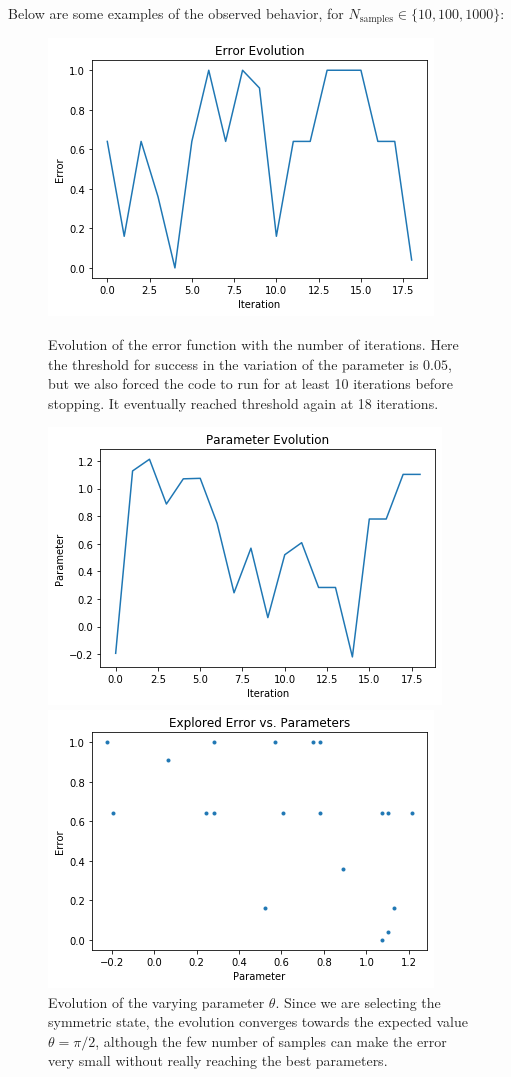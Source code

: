 \documentclass[11pt]{article}
\begin{document}
Below are some examples of the observed behavior, for $N_{\text{samples}} \in \{10,100,1000\}$: 


\begin{figure}[h!]
\centering
\includegraphics[scale=0.5]{error10}
\caption{Evolution of the error function with the number of iterations. Here the threshold for success in the variation of the parameter is $0.05$, but we also forced the code to run for at least 10 iterations before stopping. It eventually reached threshold again at 18 iterations.}
\includegraphics[scale=0.5]{parameter10}
\caption{Evolution of the varying parameter $\theta$. Since we are selecting the symmetric state, the evolution converges towards the expected value $\theta = \pi/2$, although the few number of samples can make the error very small without really reaching the best parameters.}
\includegraphics[scale=0.5]{explored10}

\end{figure}
\end{document}
